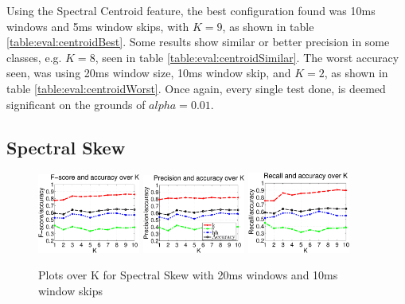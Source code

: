 		Using the Spectral Centroid feature, the best configuration found was 10ms windows and 5ms window skips, with $K=9$, as shown in table \ref{table:eval:centroidBest}. Some results show similar or better precision in some classes, e.g. $K=8$, seen in table \ref{table:eval:centroidSimilar}. The worst accuracy seen, was using 20ms window size, 10ms window skip, and $K=2$, as shown in table \ref{table:eval:centroidWorst}.
		Once again, every single test done, is deemed significant on the grounds of $alpha=0.01$.
		
				
	\subsection{Spectral Skew}
			
		\begin{figure}
			\centering\includegraphics[width=0.3\textwidth]{tex/appendices/test/sskew2010FP.png}
			\centering\includegraphics[width=0.3\textwidth]{tex/appendices/test/sskew2010_P.png}
			\centering\includegraphics[width=0.3\textwidth]{tex/appendices/test/sskew2010_R.png}
			
			\caption{Plots over K for Spectral Skew with 20ms windows and 10ms window skips}
		\end{figure}
		
